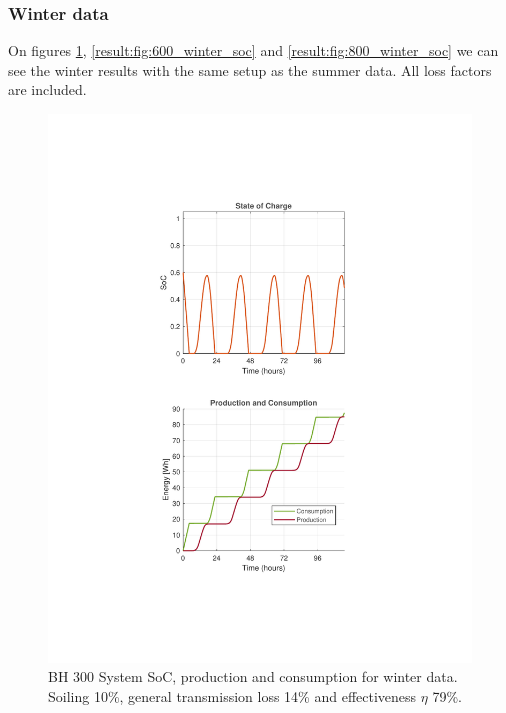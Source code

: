 \subsubsection{Winter data}
On figures \ref{result:fig:300_winter_soc}, \ref{result:fig:600_winter_soc} and \ref{result:fig:800_winter_soc} we can see the winter results with the same setup as the summer data. All loss factors are included.
\begin{minipage}[t]{0.32\textwidth} %
    \begin{figure}[H]
        \centering
        \includegraphics[width=\linewidth]{photos/Winter_SOC&Consumption_with_all_loss_5Days_300System.pdf} %
        \captionsetup{font=footnotesize} %
        \caption{BH 300 System SoC, production and consumption for winter data. Soiling 10\%, general transmission loss 14\% and effectiveness $\eta$ 79\%.}
        \label{result:fig:300_winter_soc}
    \end{figure}
\end{minipage}%
